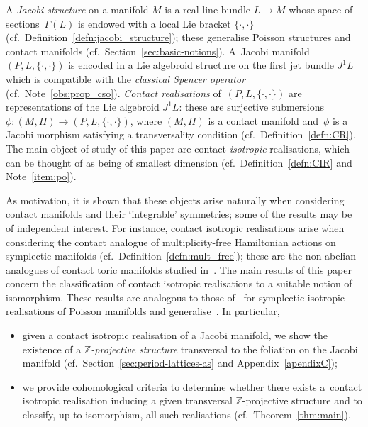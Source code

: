 \documentclass[10pt,a4paper]{amsart}
\numberwithin{equation}{section}
\newcommand{\JM}{(P,L,\{\cdot,\cdot\})} %
\newcommand{\CM}{(M,H)} %
\newcommand{\ZZ}{\mathbb{Z}}
\begin{document}
A {\it Jacobi structure} on a manifold $M$ is a real line bundle $L \to M$ whose space of sec\-tions~$\Gamma(L)$ is endowed with a local Lie bracket $\{\cdot, \cdot\}$ (cf.\ Def\/inition~\ref{defn:jacobi_structure}); these generalise Poisson structures and contact manifolds (cf.\ Section~\ref{sec:basic-notions}). A~Jacobi manifold $\JM$ is encoded in a Lie algebroid structure on the f\/irst jet bundle $J^1L$ which is compatible with the {\it classical Spencer operator} (cf.\ Note~\ref{obs:prop_cso}). {\it Contact realisations} of~$\JM$ are representations of the Lie algebroid $J^1L$: these are surjective submersions $\phi \colon \CM \to \JM$, where $\CM$ is a contact manifold and~$\phi$ is a Jacobi morphism satisfying a transversality condition (cf.\ Def\/inition~\ref{defn:CR}). The main object of study of this paper are contact {\it isotropic} realisations, which can be thought of as being of smallest dimension (cf.\ Def\/inition~\ref{defn:CIR} and Note~\ref{item:po}).

As motivation, it is shown that these objects arise naturally when considering contact ma\-ni\-folds and their `integrable' symmetries; some of the results may be of independent in\-te\-rest. For instance, contact isotropic realisations arise when considering the contact analogue of multiplicity-free Hamiltonian actions on symplectic manifolds (cf.\ Def\/inition~\ref{defn:mult_free}); these are the non-abelian analogues of contact toric manifolds studied in~\cite{lerman_contact_toric,wolbert}. The main results of this paper concern the classif\/ication of contact isotropic realisations to a suitable notion of isomorphism. These results are analogous to those of~\cite{dd} for symplectic isotropic realisations of Poisson manifolds and generalise~\cite{Banyaga,jovanovic}. In particular,
\begin{itemize}\itemsep=0pt
\item given a contact isotropic realisation of a Jacobi manifold, we show the existence of a {\it $\ZZ$-projective structure} transversal to the foliation on the Jacobi manifold (cf.\ Section~\ref{sec:period-lattices-as} and Appendix~\ref{apendixC});
\item we provide cohomological criteria to determine whether there exists a~contact isotropic realisation inducing a given transversal $\ZZ$-projective structure and to classify, up to isomorphism, all such realisations (cf.\ Theorem~\ref{thm:main}).
\end{itemize}
\end{document}
